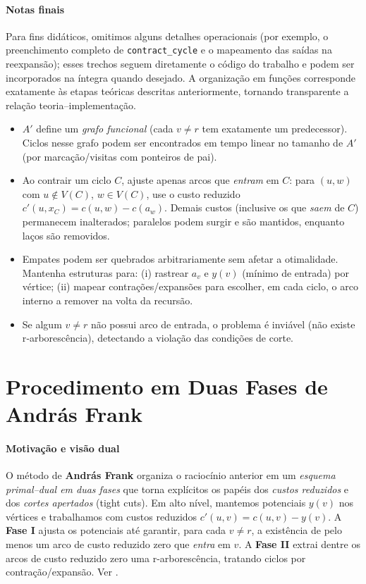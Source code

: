 \documentclass[12pt,a4paper]{article}
\begin{document}
\paragraph{Notas finais}
Para fins didáticos, omitimos alguns detalhes operacionais (por exemplo, o preenchimento completo de \texttt{contract\_cycle} e o mapeamento das saídas na reexpansão); esses trechos seguem diretamente o código do trabalho e podem ser incorporados na íntegra quando desejado. A organização em funções corresponde exatamente às etapas teóricas descritas anteriormente, tornando transparente a relação teoria–implementação.
\begin{itemize}\setlength{\itemsep}{2pt}
    \item \(A'\) define um \emph{grafo funcional} (cada \(v\neq r\) tem exatamente um predecessor). Ciclos nesse grafo podem ser encontrados em tempo linear no tamanho de \(A'\) (por marcação/visitas com ponteiros de pai).
    \item Ao contrair um ciclo \(C\), ajuste apenas arcos que \emph{entram} em \(C\): para \((u,w)\) com \(u\notin V(C)\), \(w\in V(C)\), use o custo reduzido \(c'(u,x_C)=c(u,w)-c(a_w)\). Demais custos (inclusive os que \emph{saem} de \(C\)) permanecem inalterados; paralelos podem surgir e são mantidos, enquanto laços são removidos.
    \item Empates podem ser quebrados arbitrariamente sem afetar a otimalidade. Mantenha estruturas para: (i) rastrear \(a_v\) e \(y(v)\) (mínimo de entrada) por vértice; (ii) mapear contrações/expansões para escolher, em cada ciclo, o arco interno a remover na volta da recursão.
    \item Se algum \(v\neq r\) não possui arco de entrada, o problema é inviável (não existe r‑arborescência), detectando a violação das condições de corte.
\end{itemize}


\section{Procedimento em Duas Fases de András Frank}

\paragraph{Motivação e visão dual}
O método de \textbf{András Frank} organiza o raciocínio anterior em um \emph{esquema primal–dual em duas fases} que torna explícitos os papéis dos \emph{custos reduzidos} e dos \emph{cortes apertados} (tight cuts). Em alto nível, mantemos potenciais \(y(v)\) nos vértices e trabalhamos com custos reduzidos \(c'(u,v)=c(u,v)-y(v)\). A \textbf{Fase I} ajusta os potenciais até garantir, para cada \(v\neq r\), a existência de pelo menos um arco de custo reduzido zero que \emph{entra} em \(v\). A \textbf{Fase II} extrai dentre os arcos de custo reduzido zero uma r-arborescência, tratando ciclos por contração/expansão. Ver \cite{frank2014,schrijver2003comb}.
\end{document}

